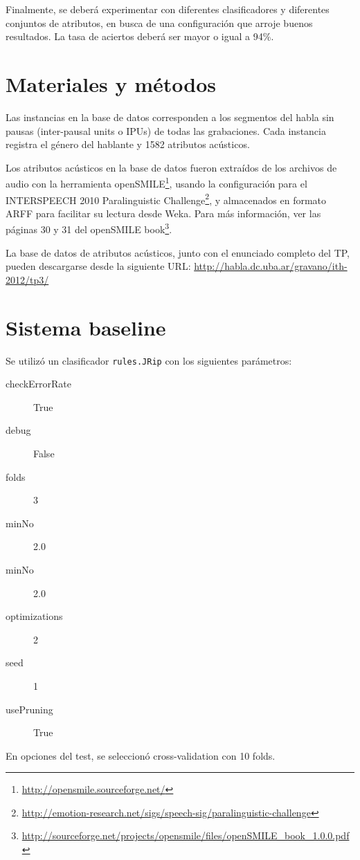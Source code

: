 \documentclass[10pt,a4paper]{article}
\begin{document}
Finalmente, se deberá experimentar con diferentes clasificadores y diferentes conjuntos de atributos, en busca de una configuración que arroje buenos resultados. La tasa de aciertos deberá ser mayor o igual a 94\%.

\section{Materiales y métodos}

Las instancias en la base de datos corresponden a los segmentos del habla sin pausas (inter-pausal units o IPUs) de todas las grabaciones. Cada instancia registra el género del hablante y 1582 atributos acústicos.

Los atributos acústicos en la base de datos fueron extraídos de los archivos de audio con la herramienta openSMILE\footnote{\url{http://opensmile.sourceforge.net/}}, usando la configuración para el INTERSPEECH 2010 Paralinguistic Challenge\footnote{\url{http://emotion-research.net/sigs/speech-sig/paralinguistic-challenge}}, y almacenados en formato ARFF para facilitar su lectura desde Weka. Para más información, ver las páginas 30 y 31 del openSMILE book\footnote{\url{http://sourceforge.net/projects/opensmile/files/openSMILE\_book\_1.0.0.pdf}}.

La base de datos de atributos acústicos, junto con el enunciado completo del TP, pueden descargarse desde la siguiente URL: \url{http://habla.dc.uba.ar/gravano/ith-2012/tp3/}

\section{Sistema baseline}

Se utilizó un clasificador \texttt{rules.JRip} con los siguientes parámetros:

\begin{description}
\item[checkErrorRate] True
\item[debug] False
\item[folds] 3
\item[minNo] 2.0
\item[minNo] 2.0
\item[optimizations] 2
\item[seed] 1
\item[usePruning] True
\end{description}

En opciones del test, se seleccionó cross-validation con 10 folds.
\end{document}
